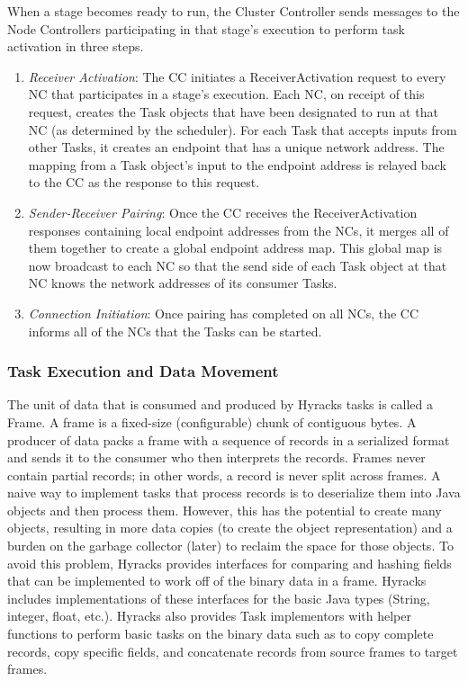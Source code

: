 When a stage becomes ready to run, the Cluster Controller sends messages to the Node Controllers participating in that stage's execution to perform task activation in three
steps.
\begin{enumerate}
\item \emph{Receiver Activation}: The CC initiates a ReceiverActivation request to every NC that participates in a stage's execution. Each NC, on receipt of this request,
creates the Task objects that have been designated to run at that NC (as determined by the scheduler). For each Task that accepts inputs from other
Tasks, it creates an endpoint that has a unique network address. The mapping from a Task object's input to the endpoint address is relayed back to the CC as the response to
this request.
\item \emph{Sender-Receiver Pairing}: Once the CC receives the ReceiverActivation responses containing local endpoint addresses from the NCs, it merges all of them together to
create a global endpoint address map. This global map is now broadcast to each NC so that the send side of each Task object at that NC knows the network addresses of its
consumer Tasks.
\item \emph{Connection Initiation}: Once pairing has completed on all NCs, the CC informs all of the NCs that the Tasks can be started.
\end{enumerate}

\subsubsection{Task Execution and Data Movement}

The unit of data that is consumed and produced by Hyracks tasks is called a Frame.
A frame is a fixed-size (configurable) chunk of contiguous bytes. A producer of data packs a frame
with a sequence of records in a serialized format and sends it to the consumer who then interprets the records. Frames never contain partial records; in other words, a record
is never split across frames. A naive way to implement tasks that process records is to deserialize them into Java objects and then process them. However, this 
has the potential to create many objects, resulting in more data copies (to create the object representation) and a burden on the garbage collector (later) to reclaim
the space for those objects. To avoid this problem, Hyracks provides interfaces for comparing and hashing fields that can be implemented to work off of the binary data
in a frame. Hyracks includes implementations of these interfaces for the basic Java types (String, integer, float, etc.). Hyracks also provides Task implementors with helper
functions to perform basic tasks on the binary data such as to copy complete records, copy specific fields, and concatenate records from source frames to target frames.

